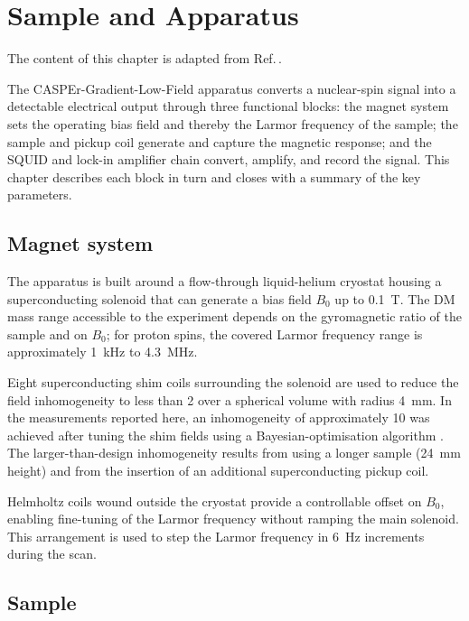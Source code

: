 \chapter{Sample and Apparatus}\label{chap:apparatus}
\begin{jointwork}
    The content of this chapter is adapted from Ref.\,\cite{Walter2024_LFthermal}.
\end{jointwork}

The CASPEr-Gradient-Low-Field apparatus converts a nuclear-spin signal into a detectable electrical output through three functional blocks: the magnet system sets the operating bias field and thereby the Larmor frequency of the sample; the sample and pickup coil generate and capture the magnetic response; and the SQUID and lock-in amplifier chain convert, amplify, and record the signal. This chapter describes each block in turn and closes with a summary of the key parameters.

\section{Magnet system}\label{sec:apparatus:magnet}

The apparatus is built around a flow-through liquid-helium cryostat housing a superconducting solenoid that can generate a bias field $B_0$ up to \SI{0.1}{\tesla}. The DM mass range accessible to the experiment depends on the gyromagnetic ratio of the sample and on $B_0$; for proton spins, the covered Larmor frequency range is approximately \SI{1}{\kHz} to \SI{4.3}{\MHz}.

Eight superconducting shim coils surrounding the solenoid are used to reduce the field inhomogeneity to less than \SI{2}{\ppm} over a spherical volume with radius \SI{4}{\mm}. In the measurements reported here, an inhomogeneity of approximately \SI{10}{\ppm} was achieved after tuning the shim fields using a Bayesian-optimisation algorithm \cite{ShimmingPaper}. The larger-than-design inhomogeneity results from using a longer sample (\SI{24}{\mm} height) and from the insertion of an additional superconducting pickup coil.

Helmholtz coils wound outside the cryostat provide a controllable offset on $B_0$, enabling fine-tuning of the Larmor frequency without ramping the main solenoid. This arrangement is used to step the Larmor frequency in \SI{6}{\Hz} increments during the scan.

\section{Sample}\label{sec:apparatus:sample}

